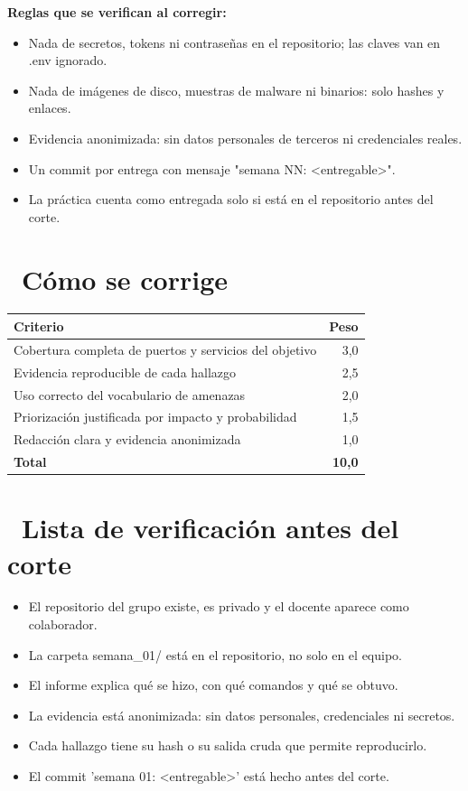\documentclass[11pt,a4paper]{article}
\newcommand{\iconotexto}[2]{\textcolor{cyanNeon}{\faIcon{#1}}~#2}
\begin{document}
\textbf{Reglas que se verifican al corregir:}

\begin{itemize}[leftmargin=1.4em,itemsep=2pt,topsep=3pt]
  \item Nada de secretos, tokens ni contraseñas en el repositorio; las claves van en .env ignorado.
  \item Nada de imágenes de disco, muestras de malware ni binarios: solo hashes y enlaces.
  \item Evidencia anonimizada: sin datos personales de terceros ni credenciales reales.
  \item Un commit por entrega con mensaje "semana NN: \textless{}entregable\textgreater{}".
  \item La práctica cuenta como entregada solo si está en el repositorio antes del corte.
\end{itemize}

\section{\iconotexto{ruler-combined}{Cómo se corrige}}

\begin{tabularx}{\linewidth}{@{}X r@{}}
\toprule
Criterio & Peso\\
\midrule
Cobertura completa de puertos y servicios del objetivo & 3,0 \\
Evidencia reproducible de cada hallazgo & 2,5 \\
Uso correcto del vocabulario de amenazas & 2,0 \\
Priorización justificada por impacto y probabilidad & 1,5 \\
Redacción clara y evidencia anonimizada & 1,0 \\
\midrule
\textbf{Total} & \textbf{10,0}\\
\bottomrule
\end{tabularx}

\section{\iconotexto{clipboard-check}{Lista de verificación antes del corte}}

\begin{itemize}[leftmargin=1.4em,itemsep=2pt,topsep=3pt]
  \item El repositorio del grupo existe, es privado y el docente aparece como colaborador.
  \item La carpeta semana\_01/ está en el repositorio, no solo en el equipo.
  \item El informe explica qué se hizo, con qué comandos y qué se obtuvo.
  \item La evidencia está anonimizada: sin datos personales, credenciales ni secretos.
  \item Cada hallazgo tiene su hash o su salida cruda que permite reproducirlo.
  \item El commit 'semana 01: \textless{}entregable\textgreater{}' está hecho antes del corte.
\end{itemize}
\end{document}
